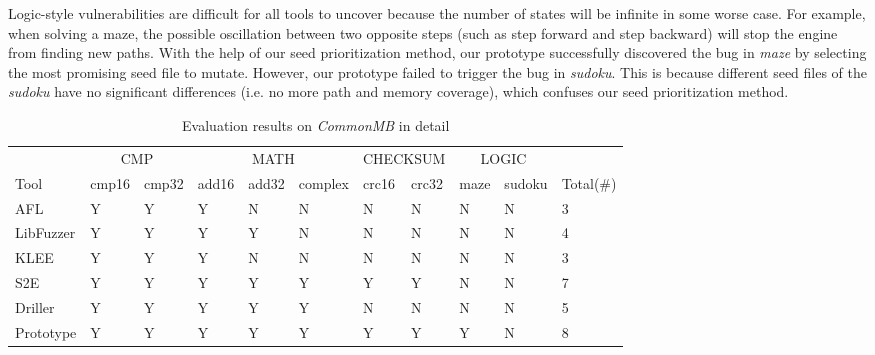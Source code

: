 Logic-style vulnerabilities are difficult for all tools to uncover because the number of states will be infinite in some worse case. For example, when solving a maze, the possible oscillation between two opposite steps (such as step forward and step backward) will stop the engine from finding new paths. With the help of our seed prioritization method, our prototype successfully discovered the bug in \textit{maze} by selecting the most promising seed file to mutate.
However, our prototype failed to trigger the bug in \textit{sudoku}. This is because different seed files of the \textit{sudoku} have no significant differences (i.e. no more path and memory coverage), which confuses our seed prioritization method.




\begin{table}
  \caption{\label{CommonMB-results-detail}Evaluation results on \textit{CommonMB} in detail}
  \centering
	\begin{tabular}{p{1.5cm}<{\centering} | p{0.8cm}<{\centering} p{0.9cm}<{\centering} | p{0.7cm}<{\centering}
	p{0.7cm}<{\centering} p{1.2cm}<{\centering} | p{0.8cm}<{\centering} p{0.8cm}<{\centering} | p{0.8cm}<{\centering} p{1cm}<{\centering} | p{1.2cm}<{\centering}}
		\toprule
	& \multicolumn{2}{c}{CMP}  & \multicolumn{3}{c}{MATH} & \multicolumn{2}{c}{CHECKSUM} & 	\multicolumn{2}{c}{LOGIC} & \\ 
	    Tool & cmp16 & cmp32 & add16 & add32 & complex & crc16 & crc32 & maze & sudoku & Total(\#) \\
		\midrule
		AFL 		& Y & Y & Y & N & N & N & N & N & N & 3 \\
		LibFuzzer	& Y & Y & Y & Y & N & N & N & N & N & 4\\
		KLEE		& Y & Y & Y & N & N & N & N & N & N & 3\\
		S2E			& Y & Y & Y & Y & Y & Y & Y & N & N & 7\\
		Driller		& Y & Y & Y & Y & Y & N & N & N & N & 5\\
		Prototype	& Y & Y & Y & Y & Y & Y & Y & Y & N & 8\\
	 \bottomrule
	\end{tabular}
\end{table}

